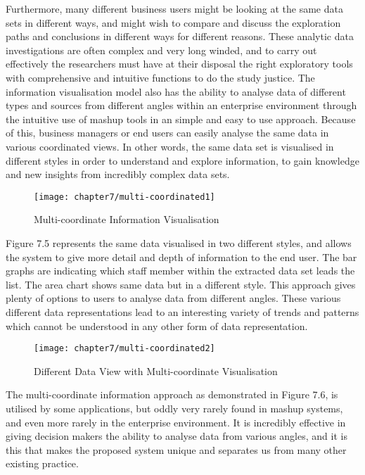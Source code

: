 Furthermore, many different business users might be looking at the same data sets in different ways, and might wish to compare and discuss the exploration paths and conclusions in different ways for different reasons. These analytic data investigations are often complex and  very long winded, and to carry out effectively the researchers must have at their disposal the right exploratory tools with comprehensive and intuitive functions to do the study justice. The information visualisation model also has the ability to analyse data of different types and sources from different angles within an enterprise environment through the intuitive use of mashup tools in an simple and easy to use approach. Because of this, business managers or end users can easily analyse the same data in various coordinated views. In other words, the same data set is visualised in different styles in order to understand and explore information, to gain  knowledge and new insights from incredibly complex data sets.

\begin{figure}[H]
\centering
\texttt{[image: chapter7/multi-coordinated1]}
\caption{Multi-coordinate Information Visualisation}
\end{figure}

Figure 7.5 represents the same data visualised in two different styles, and allows the system to give more detail and depth of information to the end user. The bar graphs are indicating which staff member within the extracted data set leads the list. The area chart shows same data but in a different style. This approach gives plenty of options to users to analyse data from different angles. These various different data representations lead to an interesting variety of trends and patterns which cannot be understood in any other form of data representation.

\begin{figure}[H]
\centering
\texttt{[image: chapter7/multi-coordinated2]}
\caption{ Different Data View with Multi-coordinate Visualisation}
\end{figure}

The multi-coordinate information approach as demonstrated in Figure 7.6, is utilised by some applications, but oddly very rarely found in mashup systems, and even more rarely in the enterprise environment. It is incredibly effective in giving decision makers the ability to analyse data from various angles, and it is this that makes the proposed system unique and separates us from many other existing practice.

